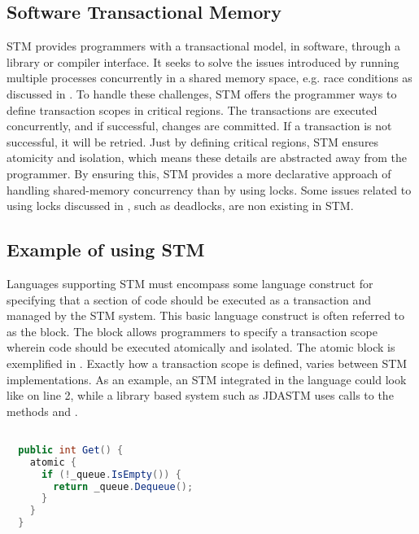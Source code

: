 \subsection{Software Transactional Memory}
\ac{STM} provides programmers with a transactional model, in software, through a library or compiler interface\cite{herlihy2011tm}. It seeks to solve the issues introduced by running multiple processes concurrently in a shared memory space, e.g. race conditions as discussed in \cite[p. 22-26]{dpt907e14trending}. To handle these challenges, \ac{STM} offers the programmer ways to define transaction scopes in critical regions. The transactions are executed concurrently, and if successful, changes are committed. If a transaction is not successful, it will be retried. Just by defining critical regions, \ac{STM} ensures atomicity and isolation, which means these details are abstracted away from the programmer\cite[p. 48]{harris2005composable}. By ensuring this, \ac{STM} provides a more declarative approach of handling shared-memory concurrency than by using locks. Some issues related to using locks discussed in \cite[p. 26-30]{dpt907e14trending}, such as deadlocks, are non existing in \ac{STM}.

\subsection{Example of using STM}
\label{sec:stm_keyconcepts_example}
Languages supporting \ac{STM} must encompass some language construct for specifying that a section of code should be executed as a transaction and managed by the \ac{STM} system. This basic language construct is often referred to as the  block\cite[p. 49]{harris2005composable}\cite[p. 3]{harris2003language}. The  block allows programmers to specify a transaction scope wherein code should be executed atomically and isolated. The atomic block is exemplified in . Exactly how a transaction scope is defined, varies between \ac{STM} implementations. As an example, an \ac{STM} integrated in the language could look like  on line 2, while a library based system such as JDASTM\cite{ramadan2009committing} uses calls to the methods  and .

\begin{lstlisting}[float, label=lst:stm_atomic_block,
  caption={Threadsafe queue},
  language=Java,  
  showspaces=false,
  showtabs=false,
  breaklines=true,
  showstringspaces=false,
  breakatwhitespace=true,
  commentstyle=\color{greencomments},
  keywordstyle=\color{bluekeywords},
  stringstyle=\color{redstrings},
  morekeywords={atomic, retry, orElse}]  % Start your code-block

  public int Get() { 
    atomic {
      if (!_queue.IsEmpty()) {
        return _queue.Dequeue();
      }
    }
  }
\end{lstlisting}

